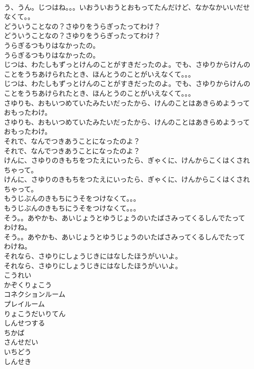 \documentclass[8pt]{extreport}
\begin{document}
\begin{CJK}{UTF8}{min}
\\	う、うん。じつはね。。。いおういおうとおもってたんだけど、なかなかいいだせなくて。。
\\	どういうことなの？さゆりをうらぎったってわけ？
\\	どういうことなの？さゆりをうらぎったってわけ？
\\	うらぎるつもりはなかったの。
\\	うらぎるつもりはなかったの。
\\	じつは、わたしもずっとけんのことがすきだったのよ。でも、さゆりからけんのことをうちあけられたとき、ほんとうのことがいえなくて。。。
\\	じつは、わたしもずっとけんのことがすきだったのよ。でも、さゆりからけんのことをうちあけられたとき、ほんとうのことがいえなくて。。。
\\	さゆりも、おもいつめていたみたいだったから、けんのことはあきらめようっておもったわけ。
\\	さゆりも、おもいつめていたみたいだったから、けんのことはあきらめようっておもったわけ。
\\	それで、なんでつきあうことになったのよ？
\\	それで、なんでつきあうことになったのよ？
\\	けんに、さゆりのきもちをつたえにいったら、ぎゃくに、けんからこくはくされちゃって。
\\	けんに、さゆりのきもちをつたえにいったら、ぎゃくに、けんからこくはくされちゃって。
\\	もうじぶんのきもちにうそをつけなくて。。。
\\	もうじぶんのきもちにうそをつけなくて。。。
\\	そう。。あやかも、あいじょうとゆうじょうのいたばさみってくるしんでたってわけね。
\\	そう。。あやかも、あいじょうとゆうじょうのいたばさみってくるしんでたってわけね。
\\	それなら、さゆりにしょうじきにはなしたほうがいいよ。
\\	それなら、さゆりにしょうじきにはなしたほうがいいよ。
\\	こうれい
\\	かぞくりょこう
\\	コネクションルーム
\\	プレイルーム
\\	りょこうだいりてん
\\	しんせつする
\\	ちかば
\\	さんせだい
\\	いちどう
\\	しんせき

\end{CJK}
\end{document}
